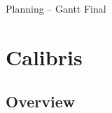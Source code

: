 \documentclass[10pt,a4paper]{beamer}
\begin{document}
\begin{frame}{Planning -- Gantt Final}

\begin{landscape}
\begin{figure}[htp] 
\end{figure}
\end{landscape}

\end{frame}

\section{Calibris}
\subsection{Overview}
\end{document}
